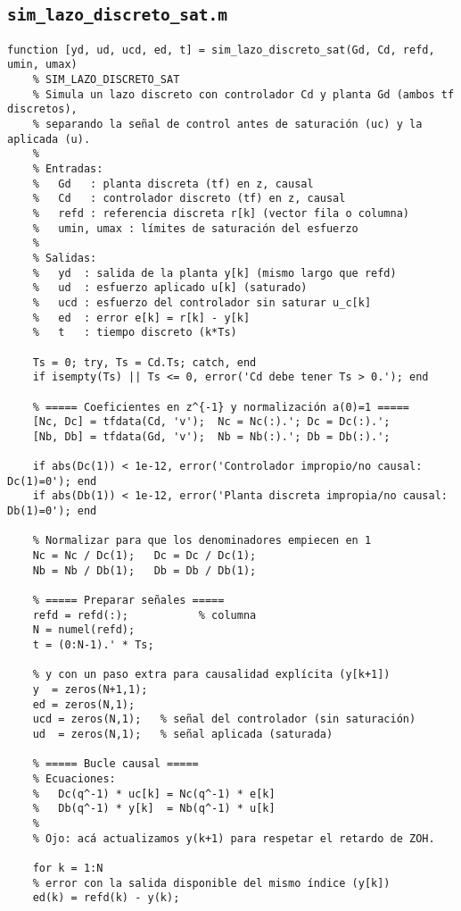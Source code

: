 {\subsection{\texttt{sim\_lazo\_discreto\_sat.m}}
\begin{lstlisting}[style=matlabstyle,caption={Simulación de lazo discreto con saturación.}]
	function [yd, ud, ucd, ed, t] = sim_lazo_discreto_sat(Gd, Cd, refd, umin, umax)
	% SIM_LAZO_DISCRETO_SAT
	% Simula un lazo discreto con controlador Cd y planta Gd (ambos tf discretos),
	% separando la señal de control antes de saturación (uc) y la aplicada (u).
	%
	% Entradas:
	%   Gd   : planta discreta (tf) en z, causal
	%   Cd   : controlador discreto (tf) en z, causal
	%   refd : referencia discreta r[k] (vector fila o columna)
	%   umin, umax : límites de saturación del esfuerzo
	%
	% Salidas:
	%   yd  : salida de la planta y[k] (mismo largo que refd)
	%   ud  : esfuerzo aplicado u[k] (saturado)
	%   ucd : esfuerzo del controlador sin saturar u_c[k]
	%   ed  : error e[k] = r[k] - y[k]
	%   t   : tiempo discreto (k*Ts)
	
	Ts = 0; try, Ts = Cd.Ts; catch, end
	if isempty(Ts) || Ts <= 0, error('Cd debe tener Ts > 0.'); end
	
	% ===== Coeficientes en z^{-1} y normalización a(0)=1 =====
	[Nc, Dc] = tfdata(Cd, 'v');  Nc = Nc(:).'; Dc = Dc(:).';
	[Nb, Db] = tfdata(Gd, 'v');  Nb = Nb(:).'; Db = Db(:).';
	
	if abs(Dc(1)) < 1e-12, error('Controlador impropio/no causal: Dc(1)=0'); end
	if abs(Db(1)) < 1e-12, error('Planta discreta impropia/no causal: Db(1)=0'); end
	
	% Normalizar para que los denominadores empiecen en 1
	Nc = Nc / Dc(1);   Dc = Dc / Dc(1);
	Nb = Nb / Db(1);   Db = Db / Db(1);
	
	% ===== Preparar señales =====
	refd = refd(:);           % columna
	N = numel(refd);
	t = (0:N-1).' * Ts;
	
	% y con un paso extra para causalidad explícita (y[k+1])
	y  = zeros(N+1,1);
	ed = zeros(N,1);
	ucd = zeros(N,1);   % señal del controlador (sin saturación)
	ud  = zeros(N,1);   % señal aplicada (saturada)
	
	% ===== Bucle causal =====
	% Ecuaciones:
	%   Dc(q^-1) * uc[k] = Nc(q^-1) * e[k]
	%   Db(q^-1) * y[k]  = Nb(q^-1) * u[k]
	%
	% Ojo: acá actualizamos y(k+1) para respetar el retardo de ZOH.
	
	for k = 1:N
	% error con la salida disponible del mismo índice (y[k])
	ed(k) = refd(k) - y(k);
	

\end{lstlisting}}
